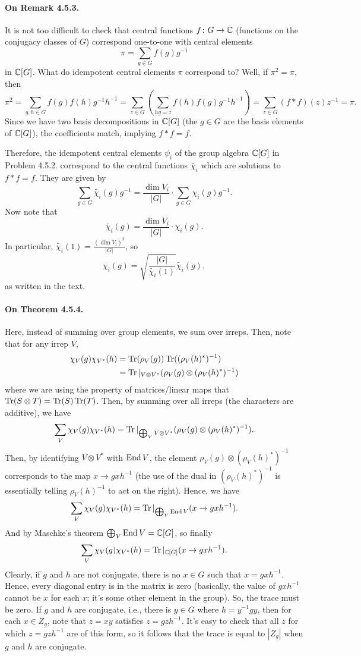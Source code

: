 \documentclass[oneside]{scrbook}
\begin{document}
\paragraph{On Remark 4.5.3.} It is not too difficult to check that central functions $f\colon G\to \mathbb C$ (functions on the conjugacy classes of $G$) correspond one-to-one with central elements
\[\pi=\sum_{g\in G}f(g)g^{-1}\]
in $\mathbb C[G]$. What do idempotent central elements $\pi$ correspond to? Well, if $\pi^2=\pi$, then
\[\pi^2=\sum_{g,h\in G}f(g)f(h)g^{-1}h^{-1}=\sum_{z\in G}\left(\sum_{hg=z}f(h)f(g)g^{-1}h^{-1}\right)=\sum_{z\in G}(f*f)(z)z^{-1}=\pi.\]
Since we have two basis decompositions in $\mathbb C[G]$ (the $g\in G$ are the basis elements of $\mathbb C[G]$), the coefficients match, implying $f*f=f$.

Therefore, the idempotent central elements $\psi_i$ of the group algebra $\mathbb C[G]$ in Problem 4.5.2. correspond to the central functions $\tilde{\chi_i}$ which are solutions to $f*f=f$. They are given by
\[\sum_{g\in G}\tilde{\chi_i}(g)g^{-1}=\frac{\dim V_i}{|G|}\cdot\sum_{g\in G}\chi_i(g)g^{-1}.\]
Now note that
\[\tilde{\chi_i}(g)=\frac{\dim V_i}{|G|}\cdot \chi_i(g).\]
In particular,
$\tilde{\chi_i}(1)=\frac{(\dim V_i)^2}{|G|}$, so
\[\chi_i(g)=\sqrt{\frac{|G|}{\tilde{\chi_i}(1)}} \tilde{\chi_i}(g),\]
as written in the text.

\paragraph{On Theorem 4.5.4.} Here, instead of summing over group elements, we sum over irreps. Then, note that for any irrep $V$,
\begin{align*}
    \chi_V(g)\chi_{V^*}(h)&=\operatorname{Tr}(\rho_V(g))\operatorname{Tr}((\rho_V(h)^*)^{-1})\\
    &= \operatorname{Tr}\vert_{V\otimes V^*}(\rho_V(g)\otimes (\rho_V(h)^*)^{-1})
\end{align*}
where we are using the property of matrices/linear maps that $\operatorname{Tr}(S\otimes T)=\operatorname{Tr}(S)\operatorname{Tr}(T)$. Then, by summing over all irreps (the characters are additive), we have
\[\sum_V \chi_V(g)\chi_{V^*}(h)=\operatorname{Tr}\vert_{\bigoplus_V V\otimes V^{*}}(\rho_V(g)\otimes (\rho_{V}(h)^*)^{-1}).\]
Then, by identifying $V\otimes V^*$ with $\operatorname{End} V$, the element $\rho_V(g)\otimes (\rho_V(h)^*)^{-1}$ corresponds to the map $x\to gxh^{-1}$ (the use of the dual in $(\rho_V(h)^*)^{-1}$ is essentially telling $\rho_V(h)^{-1}$ to act on the right). Hence, we have
\[\sum_V\chi_V(g)\chi_{V^*}(h)=\operatorname{Tr}\vert_{\bigoplus_V \operatorname{End} V}(x\to gxh^{-1}).\]
And by Maschke's theorem $\bigoplus_V \operatorname{End} V=\mathbb C[G]$, so finally
\[\sum_V\chi_V(g)\chi_{V^*}(h)=\operatorname{Tr}\vert_{\mathbb C[G]}(x\to gxh^{-1}).\]
Clearly, if $g$ and $h$ are not conjugate, there is no $x\in G$ such that $x=gxh^{-1}$. Hence, every diagonal entry is in the matrix is zero (basically, the value of $gxh^{-1}$ cannot be $x$ for each $x$; it's some other element in the group). So, the trace must be zero. If $g$ and $h$ are conjugate, i.e., there is $y\in G$ where $h=y^{-1}gy$, then for each $x\in Z_g$, note that $z=xy$ satisfies $z=gzh^{-1}$. It's easy to check that all $z$ for which $z=gzh^{-1}$ are of this form, so it follows that the trace is equal to $|Z_g|$ when $g$ and $h$ are conjugate.
\end{document}
